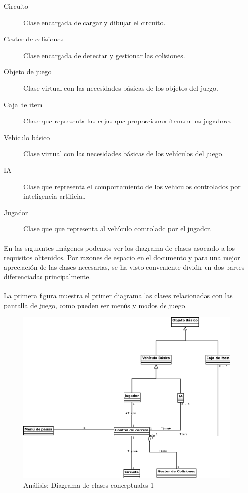 \begin{description}
    \item [Circuito] Clase encargada de cargar y dibujar el circuito.
    \item [Gestor de colisiones] Clase encargada de detectar y gestionar las colisiones.
    
    \item [Objeto de juego] Clase virtual con las necesidades básicas de los objetos del juego.
    \item [Caja de ítem] Clase que representa las cajas que proporcionan ítems a los jugadores.
    \item [Vehículo básico] Clase virtual con las necesidades básicas de los vehículos del juego.
    \item [IA] Clase que representa el comportamiento de los vehículos controlados por inteligencia artificial.
    \item [Jugador] Clase que que representa al vehículo controlado por el jugador.
\end{description}

\paragraph{}
En las siguientes imágenes podemos ver los diagrama de clases asociado a los requisitos obtenidos. Por razones de espacio en el
documento y para una mejor apreciación de las clases necesarias, se ha visto conveniente dividir en dos partes diferenciadas
principalmente.

\paragraph{}
La primera figura muestra el primer diagrama las clases relacionadas con las pantalla de juego, como pueden ser menús y 
modos de juego.

\begin{figure}[H]
  \label{diagrama_clases_conceptuales}
  \begin{center}
    \includegraphics[scale=0.4]{imagenes/analisis/diagrama_clases_conceptuales2.png}
  \end{center}
  \caption{Análisis: Diagrama de clases conceptuales 1}
\end{figure}

